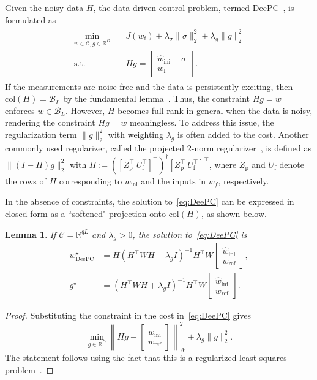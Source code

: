 \documentclass[letterpaper, 10 pt, conference]{ieeeconf}
\newtheorem{lemma}{Lemma}
\begin{document}
Given the noisy data $H$, the data-driven control problem, termed \gls{DeePC}~\cite{coulson2019data}, is formulated as
\begin{align} \label{eq:DeePC}
    \begin{split}
    \min_{w \in \mathcal{C},g\in\mathbb{R}^D} & \quad J(w_\mathrm{f}) + \lambda_\sigma \|\sigma\|_2^2 + \lambda_g\|g\|_2^2 \\
    \mathrm{s.t.} & \quad Hg = \begin{bmatrix}
        \hat{w}_\mathrm{ini} + \sigma \\ 
        w_\mathrm{f}
    \end{bmatrix}.
    \end{split}
\end{align}
If the measurements are noise free and the data is persistently exciting, then $\mathrm{col}(H) = \mathcal{B}_L$ by the fundamental lemma~\cite{willems2005note}.
Thus, the constraint $Hg=w$ enforces $w\in\mathcal{B}_L$.
However, $H$ becomes full rank in general when the data is noisy, rendering the constraint $Hg=w$ meaningless.
To address this issue, the regularization term $\|g\|_2^2$ with weighting $\lambda_g$ is often added to the cost.
Another commonly used regularizer, called the projected 2-norm regularizer~\cite{markovsky2022data,dorfler2022bridging}, is defined as $\|(I-\Pi)g\|_2^2$ with $\Pi:=
([Z_\mathrm{p}^\top~ U_\mathrm{f}^\top]^\top)^\dagger[Z_\mathrm{p}^\top~ U_\mathrm{f}^\top]^\top$, where $Z_\mathrm{p}$ and $U_\mathrm{f}$ denote the rows of $H$ corresponding to $w_\mathrm{ini}$ and the inputs in $w_{f}$, respectively.


In the absence of constraints, the solution to~\eqref{eq:DeePC} can be expressed in closed form as a ``softened" projection onto $\mathrm{col}(H)$, as shown below.
\begin{lemma} \label{lemma:DeePC}
    If $\mathcal{C} = \mathbb{R}^{qL}$ and $\lambda_g>0$, the solution to~\eqref{eq:DeePC} is
    \begin{align*}
        w^\star_\mathrm{DeePC} & =  H(H^\top W H + \lambda_g I)^{-1} H^\top W \begin{bmatrix}
    \hat{w}_\mathrm{ini} \\ w_\mathrm{ref}
\end{bmatrix}, \\
    g^\star & = (H^\top W H + \lambda_g I)^{-1}H^\top W \begin{bmatrix}
            \hat{w}_\mathrm{ini} \\ w_\mathrm{ref}
        \end{bmatrix}.
    \end{align*}
\end{lemma}
\begin{proof}
Substituting the constraint in the cost in~\eqref{eq:DeePC} gives
$$
\min_{g\in\mathbb{R}^{D}}\left\|Hg - \begin{bmatrix}
    \hat{w}_\mathrm{ini} \\ w_\mathrm{ref}
\end{bmatrix}\right\|_W^2 + \lambda_g\|g\|_2^2.
$$
The statement follows using the fact that this is a regularized least-squares problem~\cite[Section 15.1]{boyd2018introduction}.    
\end{proof}
\end{document}
